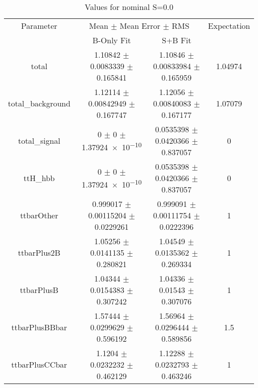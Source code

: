 \begin{table}
\centering
\caption{Values for nominal S=0.0}
\begin{tabular}{cccc}
\toprule
Parameter & \multicolumn{2}{c}{Mean $\pm$ Mean Error $\pm$ RMS} & Expectation\\
 & B-Only Fit & S+B Fit & \\
\midrule
total & \num{1.10842} $\pm$ \num{0.0083339} $\pm$ \num{0.165841} & \num{1.10846} $\pm$ \num{0.00833984} $\pm$ \num{0.165959} & \num{1.04974}\\
total\_background & \num{1.12114} $\pm$ \num{0.00842949} $\pm$ \num{0.167747} & \num{1.12056} $\pm$ \num{0.00840083} $\pm$ \num{0.167177} & \num{1.07079}\\
total\_signal & \num{0} $\pm$ \num{0} $\pm$ \num{1.37924e-10} & \num{0.0535398} $\pm$ \num{0.0420366} $\pm$ \num{0.837057} & \num{0}\\
ttH\_hbb & \num{0} $\pm$ \num{0} $\pm$ \num{1.37924e-10} & \num{0.0535398} $\pm$ \num{0.0420366} $\pm$ \num{0.837057} & \num{0}\\
ttbarOther & \num{0.999017} $\pm$ \num{0.00115204} $\pm$ \num{0.0229261} & \num{0.999091} $\pm$ \num{0.00111754} $\pm$ \num{0.0222396} & \num{1}\\
ttbarPlus2B & \num{1.05256} $\pm$ \num{0.0141135} $\pm$ \num{0.280821} & \num{1.04549} $\pm$ \num{0.0135362} $\pm$ \num{0.269334} & \num{1}\\
ttbarPlusB & \num{1.04344} $\pm$ \num{0.0154383} $\pm$ \num{0.307242} & \num{1.04336} $\pm$ \num{0.01543} $\pm$ \num{0.307076} & \num{1}\\
ttbarPlusBBbar & \num{1.57444} $\pm$ \num{0.0299629} $\pm$ \num{0.596192} & \num{1.56964} $\pm$ \num{0.0296444} $\pm$ \num{0.589856} & \num{1.5}\\
ttbarPlusCCbar & \num{1.1204} $\pm$ \num{0.0232232} $\pm$ \num{0.462129} & \num{1.12288} $\pm$ \num{0.0232793} $\pm$ \num{0.463246} & \num{1}\\
\bottomrule
\end{tabular}
\end{table}